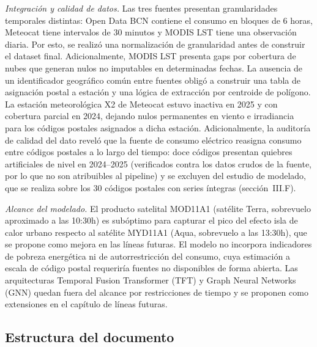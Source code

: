 \documentclass[12pt, a4paper]{article}
\begin{document}
\textit{Integración y calidad de datos.} Las tres fuentes presentan granularidades temporales distintas: Open Data BCN contiene el consumo en bloques de 6 horas, Meteocat tiene intervalos de 30 minutos y MODIS LST tiene una observación diaria. Por esto, se realizó una normalización de granularidad antes de construir el dataset final. Adicionalmente, MODIS LST presenta gaps por cobertura de nubes que generan nulos no imputables en determinadas fechas. La ausencia de un identificador geográfico común entre fuentes obligó a construir una tabla de asignación postal a estación y una lógica de extracción por centroide de polígono. La estación meteorológica X2 de Meteocat estuvo inactiva en 2025 y con cobertura parcial en 2024, dejando nulos permanentes en viento e irradiancia para los códigos postales asignados a dicha estación. Adicionalmente, la auditoría de calidad del dato reveló que la fuente de consumo eléctrico reasigna consumo entre códigos postales a lo largo del tiempo: doce códigos presentan quiebres artificiales de nivel en 2024--2025 (verificados contra los datos crudos de la fuente, por lo que no son atribuibles al pipeline) y se excluyen del estudio de modelado, que se realiza sobre los 30 códigos postales con series íntegras (sección~III.F).

\textit{Alcance del modelado.} El producto satelital MOD11A1 (satélite Terra, sobrevuelo aproximado a las 10:30h) es subóptimo para capturar el pico del efecto isla de calor urbano respecto al satélite MYD11A1 (Aqua, sobrevuelo a las 13:30h), que se propone como mejora en las líneas futuras. El modelo no incorpora indicadores de pobreza energética ni de autorrestricción del consumo, cuya estimación a escala de código postal requeriría fuentes no disponibles de forma abierta. Las arquitecturas Temporal Fusion Transformer (TFT) y Graph Neural Networks (GNN) quedan fuera del alcance por restricciones de tiempo y se proponen como extensiones en el capítulo de líneas futuras.

\subsection{Estructura del documento}
\end{document}
